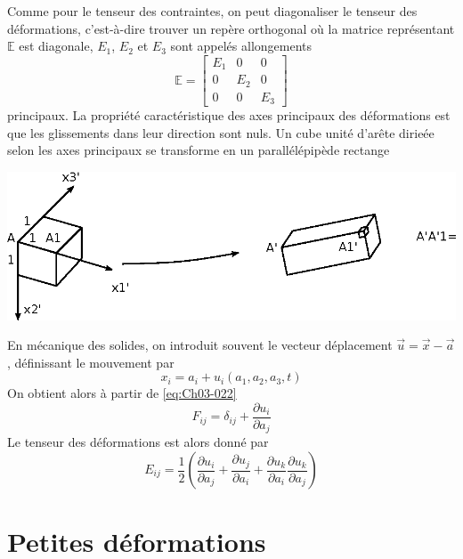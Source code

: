 Comme pour le tenseur des contraintes, on peut diagonaliser le tenseur des déformations, c'est-à-dire trouver un repère orthogonal où la matrice représentant $\mathbb{E}$ est diagonale, $E_1$, $E_2$ et $E_3$ sont appelés allongements
\begin{equation}
    \mathbb{E} = 
    \begin{bmatrix}
        E_1 & 0 & 0 \\
        0 & E_2 & 0 \\
        0 & 0 & E_3
    \end{bmatrix}
    \label{eq:Ch03-020}
\end{equation}
principaux.
La propriété caractéristique des axes principaux des déformations est que les glissements dans leur direction sont nuls.
Un cube unité d'arête dirieée selon les axes principaux se transforme en un parallélépipède rectange
\begin{center}
    \includegraphics{../images/T1_Ch03-0004}
\end{center}

En mécanique des solides, on introduit souvent le vecteur déplacement $\vec{u} = \vec{x}-\vec{a}$, définissant le mouvement par
\begin{equation}
    x_i = a_i + u_i \left( a_1, a_2, a_3, t \right)
    \label{eq:Ch03-021}
\end{equation}
On obtient alors à partir de \eqref{eq:Ch03-022}
\begin{equation}
    F_{ij} = \delta_{ij} + \frac{\partial u_i}{\partial a_j}
    \label{eq:Ch03-022}
\end{equation}
Le tenseur des déformations est alors donné par
\begin{equation}
    E_{ij} = \frac{1}{2} \left( \frac{\partial u_i}{\partial a_j} + \frac{\partial u_j}{\partial a_i} + \frac{\partial u_k}{\partial a_i}\frac{\partial u_k}{\partial a_j} \right)
    \label{eq:Ch03-023}
\end{equation}
\section{Petites déformations} \label{sec:Ch03-2}
